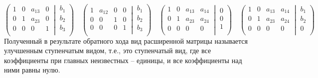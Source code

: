 \documentclass{article}
\begin{document}
\[
\left(\left.
\begin{matrix}
	1& 0&a_{13}& 0\\
	0& 1&a_{23}& 0\\
	0& 0&0&1\\
\end{matrix}
\:\right|\:
\begin{matrix}
	b_1\\
	b_2\\
	b_3\\
\end{matrix}
\right)
\quad
\left(\left.
\begin{matrix}
	1& a_{12}&0& 0\\
	0& 0&1& 0\\
	0& 0&0&1\\
\end{matrix}
\:\right|\:
\begin{matrix}
	b_1\\
	b_2\\
	b_3\\
\end{matrix}
\right)
\quad
\left(\left.
\begin{matrix}
	1& 0&a_{13}& a_{14}\\
	0&1&a_{23}& a_{24}\\
	0& 0&0& 0\\
\end{matrix}
\:\right|\:
\begin{matrix}
	0\\
	0\\
	1\\
\end{matrix}
\right)
\quad
\left(\left.
\begin{matrix}
	1&0&a_{13}& a_{14}\\
	0& 1&a_{23}& a_{24}\\
	0& 0&0& 0\\
\end{matrix}
\:\right|\:
\begin{matrix}
	b_1\\
	b_2\\
	0\\
\end{matrix}
\right)
\]
Полученный в результате обратного хода вид расширенной матрицы называется улучшенным ступенчатым видом, т.е., это ступенчатый вид, где все коэффициенты при главных неизвестных -- единицы, и все коэффициенты над ними равны нулю.
\end{document}
